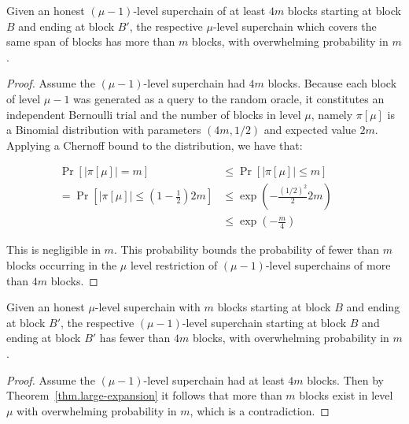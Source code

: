 \begin{theorem}
    \label{thm.large-expansion}
    Given an honest $(\mu - 1)$-level superchain of at least $4m$ blocks
    starting at block $B$ and ending at block $B'$, the respective $\mu$-level
    superchain which covers the same span of blocks has more than $m$ blocks,
    with overwhelming probability in $m$.
\end{theorem}
\begin{proof}
    Assume the $(\mu - 1)$-level superchain had $4m$ blocks. Because each block
    of level $\mu - 1$ was generated as a query to the random oracle, it
    constitutes an independent Bernoulli trial and the number of blocks in
    level $\mu$, namely $\pi[\mu]$ is a Binomial distribution with parameters
    $(4m, 1/2)$ and expected value $2m$. Applying a Chernoff bound to the
    distribution, we have that:

    \begin{align*}
            \Pr[|\pi[\mu]| = m] &\leq \Pr[|\pi[\mu]| \leq m]&&\\
           = \Pr[|\pi[\mu]| \leq (1 - \frac{1}{2})2m] &\leq \exp(-\frac{(1/2)^2}{2} 2m)&&\\
             &\leq \exp(-\frac{m}{4})&&
    \end{align*}

    This is negligible in $m$. This probability bounds the probability of fewer
    than $m$ blocks occurring in the $\mu$ level restriction of $(\mu -
    1)$-level superchains of more than $4m$ blocks.
\end{proof}

\begin{corollary}
    \label{crly.small-support}
    Given an honest $\mu$-level superchain with $m$ blocks starting at block
    $B$ and ending at block $B'$, the respective $(\mu - 1)$-level superchain
    starting at block $B$ and ending at block $B'$ has fewer than $4m$ blocks,
    with overwhelming probability in $m$.
\end{corollary}
\begin{proof}
    Assume the $(\mu - 1)$-level superchain had at least $4m$ blocks. Then by
    Theorem~\ref{thm.large-expansion} it follows that more than $m$ blocks
    exist in level $\mu$ with overwhelming probability in $m$, which is a
    contradiction.
\end{proof}


